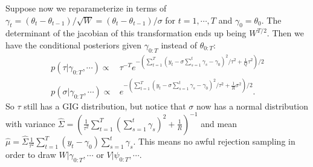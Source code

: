 \documentclass{article}
\begin{document}
Suppose now we reparameterize in terms of $\gamma_t=(\theta_t-\theta_{t-1})/\sqrt{W}=(\theta_t - \theta_{t-1})/\sigma$ for $t=1,\cdots,T$ and $\gamma_0=\theta_0$. The determinant of the jacobian of this transformation ends up being $W^{T/2}$. Then we have the conditional posteriors given $\gamma_{0:T}$ instead of $\theta_{0:T}$:
\begin{align*}
  p(\tau|\gamma_{0:T},\cdots)\propto & \tau^{-T} e^{-\left(\sum_{t=1}^T(y_t-\sigma\sum_{s=1}^t\gamma_s - \gamma_0)^2/\tau^2 + \frac{1}{Q}\tau^2\right)/2}\\
  p(\sigma|\gamma_{0:T},\cdots)\propto & e^{-\left(\sum_{t=1}^T(y_t-\sigma\sum_{s=1}^t\gamma_s - \gamma_0)^2/\tau^2 + \frac{1}{R}\sigma^2\right)/2}.
\end{align*}
So $\tau$ still has a GIG distribution, but notice that $\sigma$ now has a normal distribution with variance $\hat{\Sigma}=\left(\frac{1}{\tau^2}\sum_{t=1}^T \left( \sum_{s=1}^t\gamma_s\right)^2 + \frac{1}{R}\right)^{-1}$ and mean $\hat{\mu}=\hat{\Sigma}\frac{1}{\tau^2}\sum_{t=1}^T(y_t-\gamma_0)\sum_{s=1}^t\gamma_s$. This means no awful rejection sampling in order to draw $W|\gamma_{0:T},\cdots$ or $V|\psi_{0:T},\cdots$.
\end{document}
